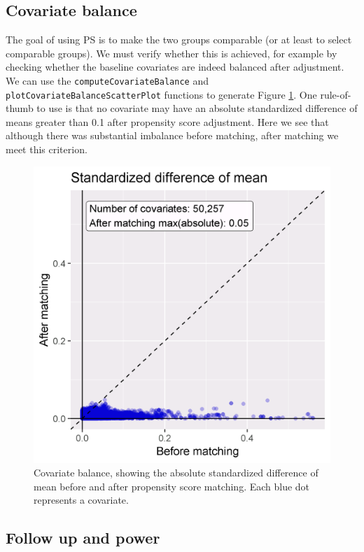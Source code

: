 \documentclass[]{book}
\begin{document}
\hypertarget{covariate-balance}{%
\subsection{Covariate balance}\label{covariate-balance}}

The goal of using PS is to make the two groups comparable (or at least to select comparable groups). We must verify whether this is achieved, for example by checking whether the baseline covariates are indeed balanced after adjustment. We can use the \texttt{computeCovariateBalance} and \texttt{plotCovariateBalanceScatterPlot} functions to generate Figure \ref{fig:balance}. One rule-of-thumb to use is that no covariate may have an absolute standardized difference of means greater than 0.1 after propensity score adjustment. Here we see that although there was substantial imbalance before matching, after matching we meet this criterion. 

\begin{figure}

{\centering \includegraphics[width=0.7\linewidth]{images/PopulationLevelEstimation/balance} 

}

\caption{Covariate balance, showing the absolute standardized difference of mean before and after propensity score matching. Each blue dot represents a covariate.}\label{fig:balance}
\end{figure}

\hypertarget{follow-up-and-power}{%
\subsection{Follow up and power}\label{follow-up-and-power}}
\end{document}

